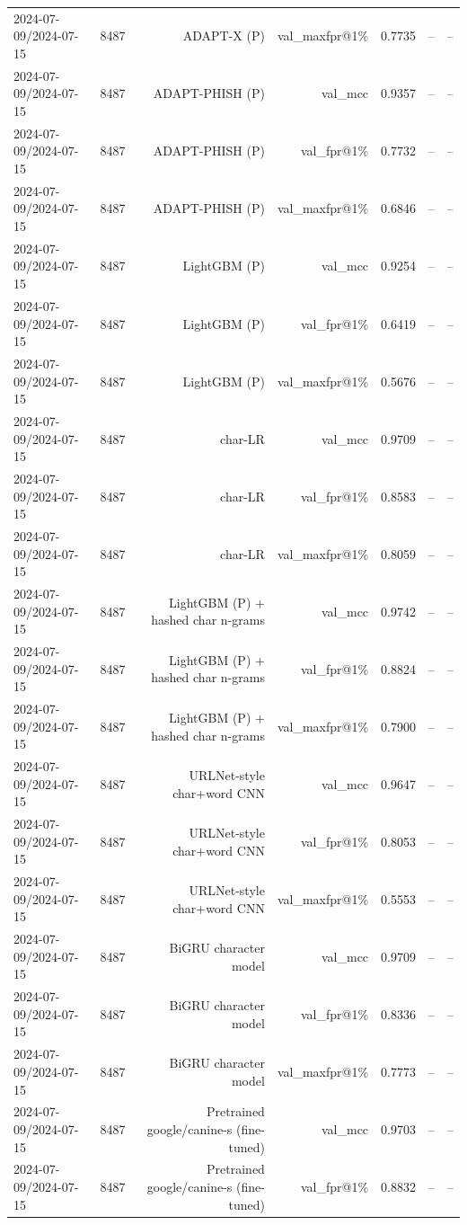 \begin{table}[t]
\begin{tabular}{llrrrrr}
2024-07-09/2024-07-15 & 8487 & ADAPT-X (P) & val\_maxfpr@1\% & 0.7735 & -- & -- \\
2024-07-09/2024-07-15 & 8487 & ADAPT-PHISH (P) & val\_mcc & 0.9357 & -- & -- \\
2024-07-09/2024-07-15 & 8487 & ADAPT-PHISH (P) & val\_fpr@1\% & 0.7732 & -- & -- \\
2024-07-09/2024-07-15 & 8487 & ADAPT-PHISH (P) & val\_maxfpr@1\% & 0.6846 & -- & -- \\
2024-07-09/2024-07-15 & 8487 & LightGBM (P) & val\_mcc & 0.9254 & -- & -- \\
2024-07-09/2024-07-15 & 8487 & LightGBM (P) & val\_fpr@1\% & 0.6419 & -- & -- \\
2024-07-09/2024-07-15 & 8487 & LightGBM (P) & val\_maxfpr@1\% & 0.5676 & -- & -- \\
2024-07-09/2024-07-15 & 8487 & char-LR & val\_mcc & 0.9709 & -- & -- \\
2024-07-09/2024-07-15 & 8487 & char-LR & val\_fpr@1\% & 0.8583 & -- & -- \\
2024-07-09/2024-07-15 & 8487 & char-LR & val\_maxfpr@1\% & 0.8059 & -- & -- \\
2024-07-09/2024-07-15 & 8487 & LightGBM (P) + hashed char n-grams & val\_mcc & 0.9742 & -- & -- \\
2024-07-09/2024-07-15 & 8487 & LightGBM (P) + hashed char n-grams & val\_fpr@1\% & 0.8824 & -- & -- \\
2024-07-09/2024-07-15 & 8487 & LightGBM (P) + hashed char n-grams & val\_maxfpr@1\% & 0.7900 & -- & -- \\
2024-07-09/2024-07-15 & 8487 & URLNet-style char+word CNN & val\_mcc & 0.9647 & -- & -- \\
2024-07-09/2024-07-15 & 8487 & URLNet-style char+word CNN & val\_fpr@1\% & 0.8053 & -- & -- \\
2024-07-09/2024-07-15 & 8487 & URLNet-style char+word CNN & val\_maxfpr@1\% & 0.5553 & -- & -- \\
2024-07-09/2024-07-15 & 8487 & BiGRU character model & val\_mcc & 0.9709 & -- & -- \\
2024-07-09/2024-07-15 & 8487 & BiGRU character model & val\_fpr@1\% & 0.8336 & -- & -- \\
2024-07-09/2024-07-15 & 8487 & BiGRU character model & val\_maxfpr@1\% & 0.7773 & -- & -- \\
2024-07-09/2024-07-15 & 8487 & Pretrained google/canine-s (fine-tuned) & val\_mcc & 0.9703 & -- & -- \\
2024-07-09/2024-07-15 & 8487 & Pretrained google/canine-s (fine-tuned) & val\_fpr@1\% & 0.8832 & -- & -- \\

\end{tabular}
\end{table}
